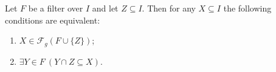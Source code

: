 Let $F$ be a filter over $I$ and let $Z \subseteq I$. Then for any $X \subseteq I$ the following conditions are equivalent:

\begin{enumerate}
\item[(i)] $X \in \mathcal{F}_g(F \cup \{Z\})$;
\item[(ii)] $\exists Y \in F \ (Y \cap Z \subseteq X)$.
\end{enumerate}
